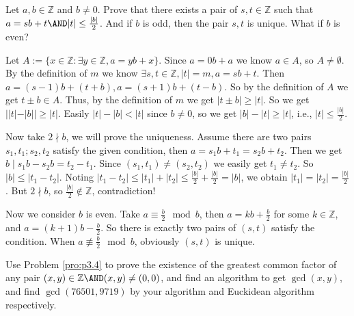 \documentclass{ctexart}
\begin{document}
\begin{problem}\label{pro:p3.4}
	Let \(a,b \in \mathbb{Z}\) and \(b \neq 0\). Prove that there exists a pair of \(s,t \in \mathbb{Z}\) such that \(a=sb + t \AND |t|\leq \frac{|b|}{2}\).
	And if \(b\) is odd, then the pair \(s,t\) is unique.
	What if \(b\) is even?
\end{problem}
\begin{solution}
	Let \(A:=\{x \in \mathbb{Z}:\exists y \in \mathbb{Z},a=yb+x\}\).
	Since \(a=0b+a\) we know \(a \in A\), so \(A \neq \emptyset\).
	By the definition of \(m\) we know \(\exists s,t \in \mathbb{Z},|t|=m,a=sb+t\).
	Then \(a=(s-1)b+(t+b),a=(s+1)b+(t-b)\). So by the definition of \(A\) we get \(t \pm b \in A\).
	Thus, by the definition of \(m\) we get \(|t \pm b| \geq |t|\).
	So we get \(||t|-|b|| \geq |t|\). Easily \(|t|-|b| < |t|\) since \(b \neq 0\), so we get \(|b|-|t| \geq |t|\), i.e., \(|t|\leq\frac{|b|}{2}\).

	Now take \(2 \nmid b\), we will prove the uniqueness.
	Assume there are two pairs \(s_1,t_1; s_2,t_2\) satisfy the given condition, then \(a=s_1 b + t_1=s_2 b + t_2\).
	Then we get \(b \mid s_1 b-s_2 b = t_2 - t_1\). Since \((s_1,t_1)\neq(s_2,t_2)\) we easily get \(t_1 \neq t_2\).
	So \(|b| \leq |t_1-t_2|\). Noting \(|t_1-t_2| \leq |t_1|+|t_2| \leq \frac{|b|}{2}+\frac{|b|}{2} = |b|\),
	we obtain \(|t_1|=|t_2|=\frac{|b|}{2}\).
	But \(2 \nmid b\), so \(\frac{|b|}{2}\notin \mathbb{Z}\), contradiction!

	Now we consider \(b \) is even.
	Take \(a \equiv \frac{b}{2}\mod b\), then \(a=kb + \frac{b}{2}\) for some \(k \in \mathbb{Z}\), and \(a=(k+1)b - \frac{b}{2}\).
	So there is exactly two pairs of \((s,t)\) satisfy the condition.
	When \(a \not \equiv \frac{b}{2} \mod b\), obviously \((s,t)\) is unique.
\end{solution}
\begin{problem}\label{pro:p6.3}
	Use Problem \ref{pro:p3.4} to prove the existence of the greatest common factor of any pair \((x,y) \in \mathbb{Z} \AND (x,y)\neq (0,0)\),
	and find an algorithm to get \(\gcd(x,y)\), and find \(\gcd(76501,9719)\) by your algorithm and Euckidean algorithm respectively.
\end{problem}
\end{document}
